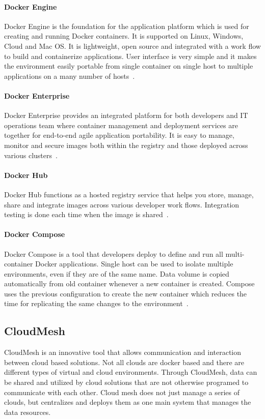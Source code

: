 	\paragraph{Docker Engine}
	Docker Engine is the foundation for the application platform
  which is used for creating and running Docker containers.
  It is supported on Linux, Windows, Cloud and Mac OS. It is
  lightweight, open source and integrated with a work flow
  to build and containerize applications. User interface is
  very simple and it makes the environment easily portable 
  from single container on single host to multiple applications
  on a many number of hosts~\cite{hackernoon}.
  
	\paragraph{Docker Enterprise}
	Docker Enterprise provides an integrated platform for both 
  developers and IT operations team where container management
  and deployment services are together for end-to-end agile 
  application portability. It is easy to manage, monitor and
  secure images both within the registry and those deployed 
  across various clusters~\cite{hackernoon}.
  
	\paragraph{Docker Hub}
	Docker Hub functions as a hosted registry service that helps you 
  store, manage, share and integrate images across various 
  developer work flows. Integration testing is done each time
  when the image is shared~\cite{hackernoon}.
  
	\paragraph{Docker Compose}
	Docker Compose is a tool that developers deploy to define and run
  all multi-container Docker applications. Single host can be used
  to isolate multiple environments, even if they are of the same name.
  Data volume is copied automatically from old container whenever a
  new container is created. Compose uses the previous configuration
  to create the new container which reduces the time for replicating
  the same changes to the environment~\cite{hackernoon}.
	
	
\subsection{CloudMesh}
CloudMesh is an innovative tool that allows communication 
and interaction between cloud based solutions. Not all
clouds are docker based and there are different types of virtual 
and cloud environments. Through CloudMesh, data can be shared
and utilized by cloud solutions that are not otherwise programed
to communicate with each other.  Cloud mesh does not just manage
a series of clouds, but centralizes and deploys them as
one main system that manages the data resources.
	
